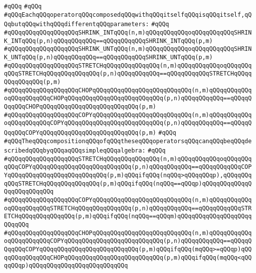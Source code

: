 \verb|#qQQq|\newline
\verb|#qQQq|\newline
\verb|#qQQqEachqQQqoperatorqQQqcomposedqQQqwithqQQqitselfqQQqisqQQqitself,qQQqbutqQQqwithqQQqdifferentqQQqparameters:|\newline
\verb|#qQQq|\newline
\verb|#qQQqqQQqqQQqqQQqqQQqSHRINK_INTqQQq(n,m)qQQqqQQqqQQqoqQQqqQQqqQQqSHRINK_INTqQQq(p,n)qQQqqQQqqQQq==qQQqqQQqqQQqSHRINK_INTqQQq(p,m)|\newline
\verb|#qQQqqQQqqQQqqQQqqQQqSHRINK_UNTqQQq(n,m)qQQqqQQqqQQqoqQQqqQQqqQQqSHRINK_UNTqQQq(p,n)qQQqqQQqqQQq==qQQqqQQqqQQqSHRINK_UNTqQQq(p,m)|\newline
\verb|#qQQqqQQqqQQqqQQqqQQqSTRETCHqQQqqQQqqQQqqQQq(n,m)qQQqqQQqqQQqoqQQqqQQqqQQqSTRETCHqQQqqQQqqQQqqQQq(p,n)qQQqqQQqqQQq==qQQqqQQqqQQqSTRETCHqQQqqQQqqQQqqQQq(p,m)|\newline
\verb|#qQQqqQQqqQQqqQQqqQQqCHOPqQQqqQQqqQQqqQQqqQQqqQQqqQQq(n,m)qQQqqQQqqQQqoqQQqqQQqqQQqCHOPqQQqqQQqqQQqqQQqqQQqqQQqqQQq(p,n)qQQqqQQqqQQq==qQQqqQQqqQQqCHOPqQQqqQQqqQQqqQQqqQQqqQQqqQQq(p,m)|\newline
\verb|#qQQqqQQqqQQqqQQqqQQqCOPYqQQqqQQqqQQqqQQqqQQqqQQqqQQq(n,m)qQQqqQQqqQQqoqQQqqQQqqQQqCOPYqQQqqQQqqQQqqQQqqQQqqQQqqQQq(p,n)qQQqqQQqqQQq==qQQqqQQqqQQqCOPYqQQqqQQqqQQqqQQqqQQqqQQqqQQq(p,m)|\newline
\verb|#qQQq|\newline
\verb|#qQQqTheqQQqcompositionqQQqofqQQqtheseqQQqoperatorsqQQqcanqQQqbeqQQqdescribedqQQqbyqQQqaqQQqsimpleqQQqalgebra:|\newline
\verb|#qQQq|\newline
\verb|#qQQqqQQqqQQqqQQqqQQqSTRETCHqQQqqQQqqQQqqQQq(n,m)qQQqqQQqqQQqoqQQqqQQqqQQqCOPYqQQqqQQqqQQqqQQqqQQqqQQqqQQq(p,n)qQQqqQQqqQQq==qQQqqQQqqQQqCOPYqQQqqQQqqQQqqQQqqQQqqQQqqQQq(p,m)qQQqifqQQq(nqQQq>qQQqqQQqp),qQQqqQQqqQQqSTRETCHqQQqqQQqqQQqqQQq(p,m)qQQqifqQQq(nqQQq==qQQqp)qQQqqQQqqQQqqQQqqQQqqQQqqQQq|\newline
\verb|#qQQqqQQqqQQqqQQqqQQqCOPYqQQqqQQqqQQqqQQqqQQqqQQqqQQq(n,m)qQQqqQQqqQQqoqQQqqQQqqQQqSTRETCHqQQqqQQqqQQqqQQq(p,n)qQQqqQQqqQQq==qQQqqQQqqQQqSTRETCHqQQqqQQqqQQqqQQq(p,m)qQQqifqQQq(nqQQq==qQQqm)qQQqqQQqqQQqqQQqqQQqqQQqqQQq|\newline
\verb|#qQQqqQQqqQQqqQQqqQQqCHOPqQQqqQQqqQQqqQQqqQQqqQQqqQQq(n,m)qQQqqQQqqQQqoqQQqqQQqqQQqCOPYqQQqqQQqqQQqqQQqqQQqqQQqqQQq(p,n)qQQqqQQqqQQq==qQQqqQQqqQQqCOPYqQQqqQQqqQQqqQQqqQQqqQQqqQQq(p,m)qQQqifqQQq(mqQQq>=qQQqp)qQQqqQQqqQQqqQQqCHOPqQQqqQQqqQQqqQQqqQQqqQQqqQQq(p,m)qQQqifqQQq(mqQQq<qQQqqQQqp)qQQqqQQqqQQqqQQqqQQqqQQqqQQq|\newline
